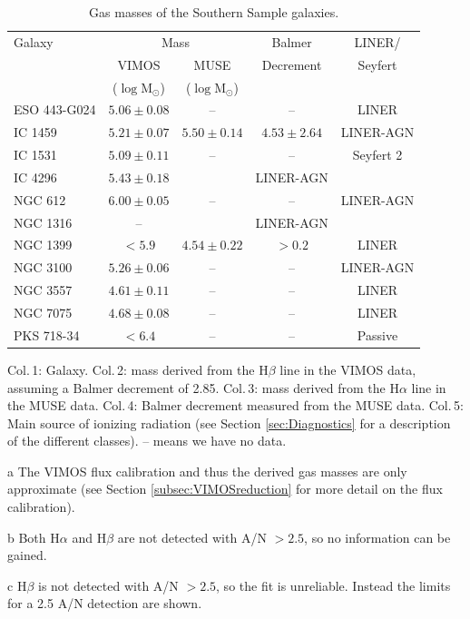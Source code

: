 \begin{table}
	\centering
\begin{threeparttable}
	\caption{Gas masses of the Southern Sample galaxies.}
	\label{tab:gasMass}
	\begin{tabular}{l c c c c}
		\hline
		\hline
		Galaxy & \multicolumn{2}{c}{\ion{H}{ii} Mass} & Balmer & LINER/ \\
		& VIMOS\tnote{a} & MUSE & Decrement & Seyfert \\
		& ($\log\mathrm{M_\odot}$) & ($\log\mathrm{M_\odot}$) & \\
		\hline
		ESO 443-G024 & $5.06 \pm 0.08$ 	& --  		& -- & LINER \\
		IC 1459 	& $5.21 \pm 0.07$	& $5.50 \pm 0.14$ & $4.53 \pm 2.64$ & LINER-AGN\\
		IC 1531 	& $5.09 \pm 0.11$	& -- 		& -- & Seyfert 2\\
		IC 4296		& $5.43 \pm 0.18$	& \tnote{b} & LINER-AGN \\
		NGC 612 	& $6.00 \pm 0.05$ 	& -- 		& -- & LINER-AGN \\
		NGC 1316 	& -- 				& \tnote{b} & LINER-AGN \\
		NGC 1399 	& $< 5.9$\tnote{c}	& $4.54 \pm 0.22$ & $>0.2$\tnote{c} & LINER \\
		NGC 3100 	& $5.26 \pm 0.06$	& -- 		& -- & LINER-AGN \\
		NGC 3557 	& $4.61 \pm 0.11$ 	& -- 		& -- & LINER \\
		NGC 7075 	& $4.68 \pm 0.08$	& -- 		& -- & LINER \\
		PKS 718-34  & $< 6.4$\tnote{c} & -- & -- & Passive \\
		\hline
		\hline
	\end{tabular}
	\begin{tablenotes}
	\footnotesize
	\note Col.\,1: Galaxy. Col.\,2:  mass derived from the H$\beta$ line in the VIMOS data, assuming a Balmer decrement of 2.85. Col.\,3:  mass derived from the H$\alpha$ line in the MUSE data. Col.\,4: Balmer decrement measured from the MUSE data. Col.\,5: Main source of ionizing radiation (see Section \ref{sec:Diagnostics} for a description of the different classes). -- means we have no data.
	\item [a] The VIMOS flux calibration and thus the derived gas masses are only approximate (see Section \ref{subsec:VIMOSreduction} for more detail on the flux calibration).
	\item [b] Both H$\alpha$ and H$\beta$ are not detected with A/N $>2.5$, so no information can be gained.
	\item [c] H$\beta$ is not detected with A/N $> 2.5$, so the fit is unreliable. Instead the limits for a 2.5 A/N detection are shown.
	\end{tablenotes}
\end{threeparttable}
\end{table}

